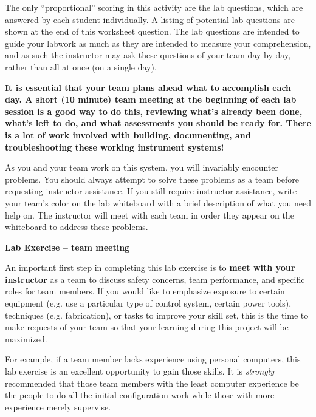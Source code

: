 The only ``proportional'' scoring in this activity are the lab questions, which are answered by each student individually.  A listing of potential lab questions are shown at the end of this worksheet question.  The lab questions are intended to guide your labwork as much as they are intended to measure your comprehension, and as such the instructor may ask these questions of your team day by day, rather than all at once (on a single day).

\vskip 10pt

{\bf It is essential that your team plans ahead what to accomplish each day.  A short (10 minute) team meeting at the beginning of each lab session is a good way to do this, reviewing what's already been done, what's left to do, and what assessments you should be ready for.  There is a lot of work involved with building, documenting, and troubleshooting these working instrument systems!}

As you and your team work on this system, you will invariably encounter problems.  You should always attempt to solve these problems as a team before requesting instructor assistance.  If you still require instructor assistance, write your team's color on the lab whiteboard with a brief description of what you need help on.  The instructor will meet with each team in order they appear on the whiteboard to address these problems.






\vfil \eject

\noindent
{\bf Lab Exercise -- team meeting}

\vskip 5pt

An important first step in completing this lab exercise is to {\bf meet with your instructor} as a team to discuss safety concerns, team performance, and specific roles for team members.  If you would like to emphasize exposure to certain equipment (e.g. use a particular type of control system, certain power tools), techniques (e.g. fabrication), or tasks to improve your skill set, this is the time to make requests of your team so that your learning during this project will be maximized.

For example, if a team member lacks experience using personal computers, this lab exercise is an excellent opportunity to gain those skills.  It is {\it strongly} recommended that those team members with the least computer experience be the people to do all the initial configuration work while those with more experience merely supervise.

